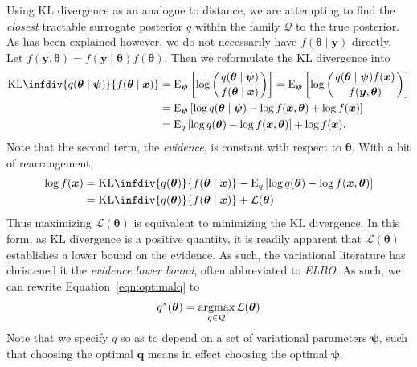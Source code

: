Using KL divergence as an analogue to distance, we are attempting to find
    the \emph{closest} tractable surrogate posterior $q$ within the family 
    $\mathcal{Q}$ to the true posterior.  
    As has been explained however, we do not necessarily have 
    $f(\bm{\theta}\mid\bm{y})$ directly.  Let 
    $f(\bm{y},\bm{\theta}) = f(\bm{y}\mid\bm{\theta})f(\bm{\theta})$.
    Then we reformulate the KL divergence into
    \[
        \begin{aligned}
        \text{KL}\infdiv{q(\bm{\theta}\mid\bm{\psi})}{f(\bm{\theta}\mid\bm{x})}
            &=\text{E}_{\bm{\psi}}\left[\log\left(
                \frac{q(\bm{\theta}\mid\bm{\psi})}{f(\bm{\theta}\mid\bm{x})}
                \right)\right] = \text{E}_{\bm{\psi}}\left[
                \log\left(\frac{q(\bm{\theta}\mid\bm{\psi})f(\bm{x})}{f(\bm{y},\bm{\theta})}
                \right)\right]\\
            &= \text{E}_{\bm{\psi}}\left[
                \log q(\bm{\theta}\mid\bm{\psi}) - \log f(\bm{x},\bm{\theta}) 
                + \log f(\bm{x})
                \right]\\
            &= \text{E}_{q}\left[
                \log q(\bm{\theta}) - \log f(\bm{x},\bm{\theta})\right] + 
                   \log f(\bm{x}).
        \end{aligned}
    \]
    Note that the second term, the \emph{evidence}, is constant with respect to 
    $\bm{\theta}$.  With a bit of rearrangement,
    \[
        \begin{aligned}
        \log f(\bm{x}) 
            &= \text{KL}\infdiv{q(\bm{\theta})}{f(\bm{\theta}\mid\bm{x})}
                - \text{E}_q\left[
                \log q(\bm{\theta}) - \log f(\bm{x},\bm{\theta})
                \right]\\
            &= \text{KL}\infdiv{q(\bm{\theta})}{f(\bm{\theta}\mid\bm{x})}
                + \mathcal{L}(\bm{\theta})
        \end{aligned}
    \]
    Thus maximizing $\mathcal{L}(\bm{\theta})$ is equivalent to minimizing the 
    KL divergence. In this form, as KL divergence is a positive quantity, it is
    readily apparent that $\mathcal{L}(\bm{\theta})$ establishes a lower bound
    on the evidence.  As such, the variational literature has christened it the
    \emph{evidence lower bound}, often abbreviated to \emph{ELBO}.  As such,
    we can rewrite Equation~\eqref{eqn:optimalq} to
    \[
        q^*(\bm{\theta}) = \operatorname*{argmax}_{q\in\mathcal{Q}} \mathcal{L}(\bm{\theta})
    \]
    Note that we specify $q$ so as to depend on a set of variational parameters 
    $\bm{\psi}$, such that choosing the optimal $\bm{q}$ means in effect choosing
    the optimal $\bm{\psi}$.  


